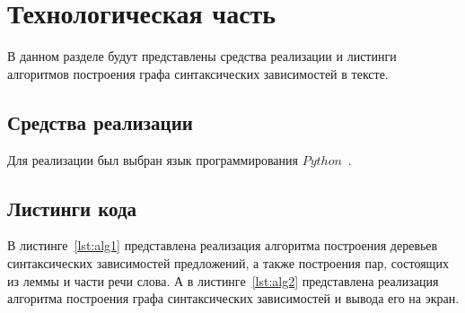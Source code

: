 \chapter{Технологическая часть}

В данном разделе будут представлены средства реализации и листинги алгоритмов построения графа синтаксических зависимостей в тексте.

\section{Средства реализации}

Для реализации был выбран язык программирования $Python$~\cite{python-lang}.

\section{Листинги кода}

В листинге~\ref{lst:alg1} представлена реализация алгоритма построения деревьев синтаксических зависимостей предложений, а также построения пар, состоящих из леммы и части речи слова. А в листинге~\ref{lst:alg2} представлена реализация алгоритма построения графа синтаксических зависимостей и вывода его на экран.

